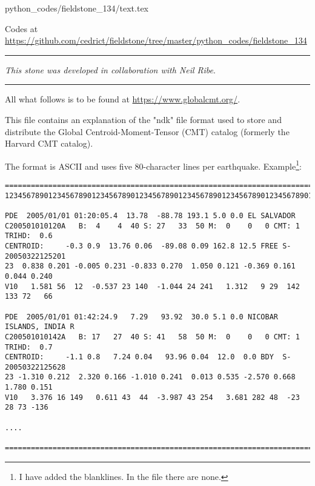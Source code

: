 \begin{flushright} {\tiny {\color{gray} python\_codes/fieldstone\_134/text.tex}} \end{flushright}

%

\begin{center}
\inpython Codes at \url{https://github.com/cedrict/fieldstone/tree/master/python_codes/fieldstone_134}
\end{center}

\par\noindent\rule{\textwidth}{0.4pt}

{\sl This stone was developed in collaboration with Neil Ribe}. 

\par\noindent\rule{\textwidth}{0.4pt}



All what follows is to be found at \url{https://www.globalcmt.org/}.
\cite{eknd12}

This file contains an explanation of the "ndk" file format used to store
and distribute the Global Centroid-Moment-Tensor (CMT) catalog
(formerly the Harvard CMT catalog).

The format is ASCII and uses five 80-character lines per earthquake. 
Example\footnote{I have added the blanklines. In the file there are none.}:

\begin{center}
\begin{verbatim}
================================================================================
12345678901234567890123456789012345678901234567890123456789012345678901234567890

PDE  2005/01/01 01:20:05.4  13.78  -88.78 193.1 5.0 0.0 EL SALVADOR             
C200501010120A   B:  4    4  40 S: 27   33  50 M:  0    0   0 CMT: 1 TRIHD:  0.6
CENTROID:     -0.3 0.9  13.76 0.06  -89.08 0.09 162.8 12.5 FREE S-20050322125201
23  0.838 0.201 -0.005 0.231 -0.833 0.270  1.050 0.121 -0.369 0.161  0.044 0.240
V10   1.581 56  12  -0.537 23 140  -1.044 24 241   1.312   9 29  142 133 72   66

PDE  2005/01/01 01:42:24.9   7.29   93.92  30.0 5.1 0.0 NICOBAR ISLANDS, INDIA R
C200501010142A   B: 17   27  40 S: 41   58  50 M:  0    0   0 CMT: 1 TRIHD:  0.7
CENTROID:     -1.1 0.8   7.24 0.04   93.96 0.04  12.0  0.0 BDY  S-20050322125628
23 -1.310 0.212  2.320 0.166 -1.010 0.241  0.013 0.535 -2.570 0.668  1.780 0.151
V10   3.376 16 149   0.611 43  44  -3.987 43 254   3.681 282 48  -23  28 73 -136

....

================================================================================
\end{verbatim}
\end{center}


